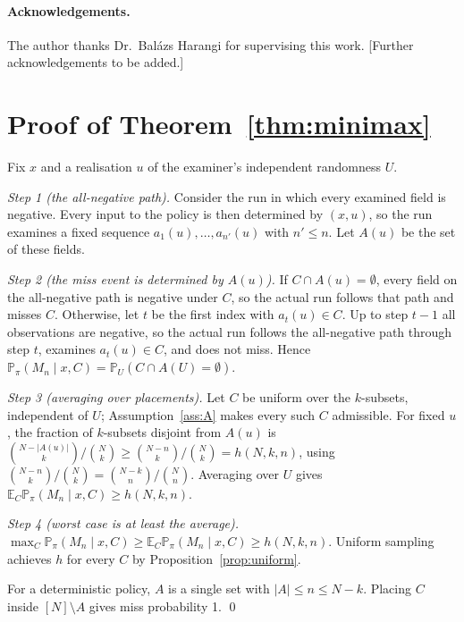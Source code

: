 \documentclass[11pt]{article}
\theoremstyle{remark}
\theoremstyle{definition}
\newcommand{\Prb}{\mathbb{P}}
\newcommand{\E}{\mathbb{E}}
\begin{document}
\paragraph{Acknowledgements.} The author thanks Dr.\ Bal\'azs Harangi for supervising this work. [Further acknowledgements to be added.]




\appendix
\section{Proof of Theorem~\ref{thm:minimax}}\label{app:proof}
Fix $x$ and a realisation $u$ of the examiner's independent randomness $U$.

\emph{Step 1 (the all-negative path).} Consider the run in which every examined field is negative. Every input to the policy is then determined by $(x,u)$, so the run examines a fixed sequence $a_1(u),\dots,a_{n'}(u)$ with $n'\le n$. Let $A(u)$ be the set of these fields.

\emph{Step 2 (the miss event is determined by $A(u)$).} If $C\cap A(u)=\emptyset$, every field on the all-negative path is negative under $C$, so the actual run follows that path and misses $C$. Otherwise, let $t$ be the first index with $a_t(u)\in C$. Up to step $t-1$ all observations are negative, so the actual run follows the all-negative path through step $t$, examines $a_t(u)\in C$, and does not miss. Hence $\Prb_\pi(M_n\mid x,C)=\Prb_U(C\cap A(U)=\emptyset)$.

\emph{Step 3 (averaging over placements).} Let $C$ be uniform over the $k$-subsets, independent of $U$; Assumption~\ref{ass:A} makes every such $C$ admissible. For fixed $u$, the fraction of $k$-subsets disjoint from $A(u)$ is $\binom{N-|A(u)|}{k}/\binom{N}{k}\ge\binom{N-n}{k}/\binom{N}{k}=h(N,k,n)$, using $\binom{N-n}{k}/\binom{N}{k}=\binom{N-k}{n}/\binom{N}{n}$. Averaging over $U$ gives $\E_C\Prb_\pi(M_n\mid x,C)\ge h(N,k,n)$.

\emph{Step 4 (worst case is at least the average).} $\max_C\Prb_\pi(M_n\mid x,C)\ge\E_C\Prb_\pi(M_n\mid x,C)\ge h(N,k,n)$. Uniform sampling achieves $h$ for every $C$ by Proposition~\ref{prop:uniform}.

For a deterministic policy, $A$ is a single set with $|A|\le n\le N-k$. Placing $C$ inside $[N]\setminus A$ gives miss probability 1. \qed
\end{document}
